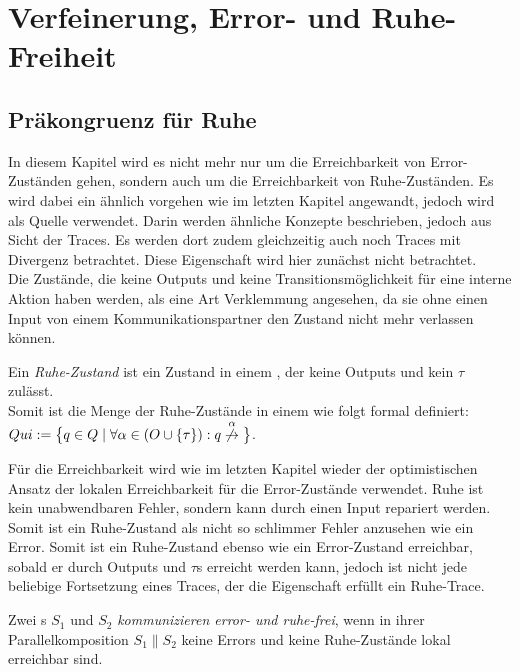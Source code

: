\chapter{Verfeinerung, Error- und Ruhe-Freiheit}

\section{Präkongruenz für Ruhe}

In diesem Kapitel wird es nicht mehr nur um die Erreichbarkeit von
Error-Zuständen gehen, sondern auch um die Erreichbarkeit von
Ruhe-Zuständen. Es wird dabei ein ähnlich vorgehen wie im letzten Kapitel
angewandt, jedoch wird~\cite{Chilton2013} als Quelle verwendet. Darin werden ähnliche
Konzepte beschrieben, jedoch aus Sicht der Traces. Es werden dort zudem
gleichzeitig auch noch Traces mit Divergenz betrachtet. Diese Eigenschaft wird
hier zunächst nicht betrachtet.\\
Die Zustände, die keine Outputs und keine Transitionsmöglichkeit für
eine interne Aktion haben werden, als eine Art Verklemmung angesehen, da sie
ohne einen Input von einem Kommunikationspartner den Zustand nicht mehr
verlassen können.

\begin{Def}[Ruhe]
  Ein \emph{Ruhe-Zustand} ist ein Zustand in einem \EIO{}, der keine
  Outputs und kein $\tau$ zulässt.\\
  Somit ist die Menge der Ruhe-Zustände in einem \EIO{} wie folgt formal
  definiert: $Qui:=\big\{q\in Q\mid \forall \alpha\in (O\cup \{\tau\}): q
  \overset{\alpha}{\not{\hspace{-0.1cm}\rightarrow}}\big\}$.
\end{Def}

Für die Erreichbarkeit wird wie im letzten Kapitel wieder der
optimistischen Ansatz der lokalen Erreichbarkeit für die Error-Zustände
verwendet. Ruhe ist kein unabwendbaren Fehler, sondern kann durch einen Input
repariert werden. Somit ist ein Ruhe-Zustand als nicht so \glqq{}schlimmer
Fehler\grqq{} anzusehen wie ein Error. Somit ist ein Ruhe-Zustand ebenso wie
ein Error-Zustand erreichbar, sobald er durch Outputs und $\tau$s erreicht
werden kann, jedoch ist nicht jede beliebige Fortsetzung eines Traces, der die
Eigenschaft erfüllt ein Ruhe-Trace.

\begin{Def}
  Zwei \EIO{}s $S_1$ und $S_2$ \emph{kommunizieren error- und ruhe-frei}, wenn
  in ihrer Parallelkomposition $S_1\| S_2$ keine Errors und keine Ruhe-Zustände
  lokal erreichbar sind.
\end{Def}


